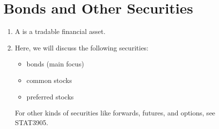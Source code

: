 \section{Bonds and Other Securities}
\label{sect:bonds-other-securities}
\begin{enumerate}
\item A  is a tradable financial asset.
\item Here, we will discuss the following securities:
\begin{itemize}
\item bonds (main focus)
\item common stocks
\item preferred stocks
\end{itemize}
For other kinds of securities like forwards, futures, and options, see STAT3905.
\end{enumerate}
